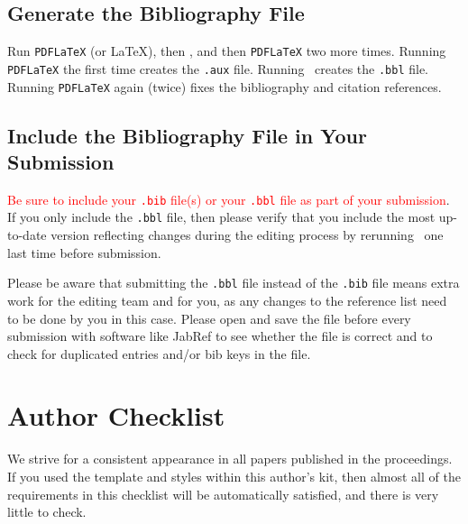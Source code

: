 \documentclass{scspaperproc}
\theoremstyle{scsthe}
\begin{document}
    
    
    

\subsection{Generate the Bibliography File}

Run \texttt{PDFLaTeX} (or \LaTeX), then \BibTeX, and then \texttt{PDFLaTeX} two more times. Running \texttt{PDFLaTeX} the first time creates the \texttt{.aux} file. Running \BibTeX\ creates the \texttt{.bbl} file.  Running \texttt{PDFLaTeX} again (twice) fixes the bibliography and citation references.


\subsection{Include the Bibliography File in Your Submission}
\label{sec:submitbib}

\textcolor{red}{Be sure to include your \texttt{.bib} file(s) or your \texttt{.bbl} file as part of your submission}. If you only include the \texttt{.bbl} file, then please verify that you include the most up-to-date version reflecting changes during the editing process by rerunning \BibTeX\ one last time before submission.

Please be aware that submitting the \texttt{.bbl} file instead of the \texttt{.bib} file means extra work for the editing team and for you, as any changes to the reference list need to be done by you in this case.
Please open and save the file before every submission with software like JabRef to see whether the file is correct and to check for duplicated entries and/or bib keys in the file.


\section{Author Checklist}
We strive for a consistent appearance in all papers published in the proceedings. If you used the template and styles within this author’s kit, then almost all of the requirements in this checklist will be automatically satisfied, and there is very little to check.
\end{document}
